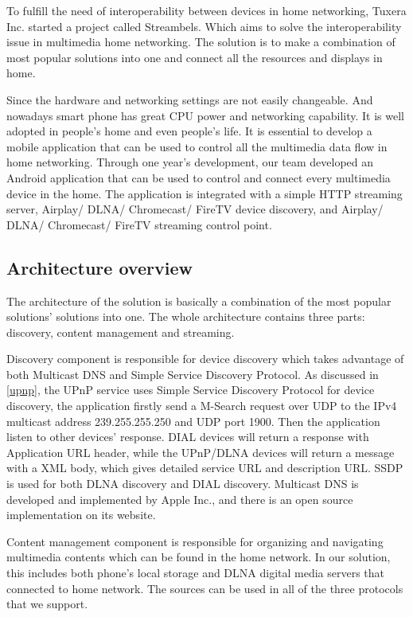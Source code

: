 
To fulfill the need of interoperability between devices in home networking,
Tuxera Inc. started a project called Streambels. Which aims to solve the
interoperability issue in multimedia home networking. The solution is to make a
combination of most popular solutions into one and connect all the resources
and displays in home. 

Since the hardware and networking settings are not easily changeable. And
nowadays smart phone has great CPU power and networking capability. It is well
adopted in people's home and even people's life. It is essential to develop a
mobile application that can be used to control all the multimedia data flow in
home networking. Through one year's development, our team developed an Android
application that can be used to control and connect every multimedia device in
the home. The application is integrated with a simple HTTP streaming server,
Airplay/ DLNA/ Chromecast/ FireTV device discovery, and
Airplay/ DLNA/ Chromecast/ FireTV streaming control point.

\subsection{Architecture overview}
The architecture of the solution is basically a combination of the most popular
solutions' solutions into one. The whole architecture contains three parts:
discovery, content management and streaming. 

Discovery component is responsible for device discovery which takes advantage of
both Multicast DNS and Simple Service Discovery Protocol. As discussed in
\ref{upnp}, the UPnP service uses Simple Service Discovery Protocol for device
discovery, the application firstly send a M-Search request over UDP to the
IPv4 multicast address 239.255.255.250 and UDP port 1900. Then the application
listen to other devices' response. DIAL devices will return a response with
Application URL header, while the UPnP/DLNA devices will return a message with
a XML body, which gives detailed service URL and description URL. SSDP is used
for both DLNA discovery and DIAL discovery. Multicast DNS is developed and
implemented by Apple Inc., and there is an open source implementation on its
website.

Content management component is responsible for organizing and
navigating multimedia contents which can be found in the home network. In our
solution, this includes both phone's local storage and DLNA digital media
servers that connected to home network. The sources can be used in all of the
three protocols that we support.

